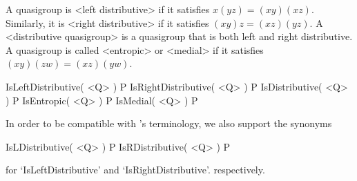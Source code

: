 A quasigroup is <left distributive> if it
satisfies $x(yz)=(xy)(xz)$. Similarly, it is <right distributive> if it satisfies $(xy)z=(xz)(yz)$. A <distributive quasigroup>
%
%
 is a quasigroup that is both left and right distributive. A
quasigroup is called <entropic> or
<medial> if it satisfies $(xy)(zw)=(xz)(yw)$.

\>IsLeftDistributive( <Q> ) P
\>IsRightDistributive( <Q> ) P
\>IsDistributive( <Q> ) P
\>IsEntropic( <Q> ) P
\>IsMedial( <Q> ) P

In order to be compatible with {\GAP}'s terminology, we also support the synonyms

\>IsLDistributive( <Q> ) P
\>IsRDistributive( <Q> ) P

for `IsLeftDistributive' and `IsRightDistributive'. respectively.


